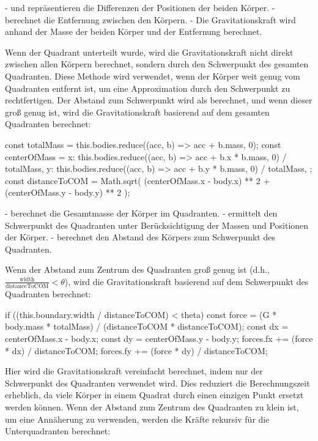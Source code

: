 \documentclass[a4paper,12pt,twoside]{article}
\begin{document}
-  und  repräsentieren die Differenzen der Positionen der beiden Körper.
-  berechnet die Entfernung zwischen den Körpern.
- Die Gravitationskraft  wird anhand der Masse der beiden Körper und der Entfernung berechnet.


Wenn der Quadrant unterteilt wurde, wird die Gravitationskraft nicht direkt zwischen allen Körpern berechnet, sondern durch den Schwerpunkt des gesamten Quadranten. Diese Methode wird verwendet, wenn der Körper weit genug vom Quadranten entfernt ist, um eine Approximation durch den Schwerpunkt zu rechtfertigen. Der Abstand zum Schwerpunkt wird als  berechnet, und wenn dieser groß genug ist, wird die Gravitationskraft basierend auf dem gesamten Quadranten berechnet:

\begin{javascript}
const totalMass = this.bodies.reduce((acc, b) => acc + b.mass, 0);
const centerOfMass = {
  x: this.bodies.reduce((acc, b) => acc + b.x * b.mass, 0) / totalMass,
  y: this.bodies.reduce((acc, b) => acc + b.y * b.mass, 0) / totalMass,
};
const distanceToCOM = Math.sqrt(
  (centerOfMass.x - body.x) ** 2 + (centerOfMass.y - body.y) ** 2
);
\end{javascript}

-  berechnet die Gesamtmasse der Körper im Quadranten.
-  ermittelt den Schwerpunkt des Quadranten unter Berücksichtigung der Massen und Positionen der Körper.
-  berechnet den Abstand des Körpers zum Schwerpunkt des Quadranten.

Wenn der Abstand zum Zentrum des Quadranten groß genug ist (d.h., \( \frac{\text{width}}{\text{distanceToCOM}} < \theta \)), wird die Gravitationskraft basierend auf dem Schwerpunkt des Quadranten berechnet:

\begin{javascript}
if ((this.boundary.width / distanceToCOM) < theta) {
    const force = (G * body.mass * totalMass) / (distanceToCOM * distanceToCOM);
    const dx = centerOfMass.x - body.x;
    const dy = centerOfMass.y - body.y;
    forces.fx += (force * dx) / distanceToCOM;
    forces.fy += (force * dy) / distanceToCOM;
}
\end{javascript}

Hier wird die Gravitationskraft vereinfacht berechnet, indem nur der Schwerpunkt des Quadranten verwendet wird. Dies reduziert die Berechnungszeit erheblich, da viele Körper in einem Quadrat durch einen einzigen Punkt ersetzt werden können.
Wenn der Abstand zum Zentrum des Quadranten zu klein ist, um eine Annäherung zu verwenden, werden die Kräfte rekursiv für die Unterquadranten berechnet:
\end{document}
